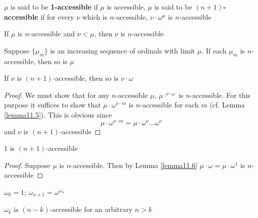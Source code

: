 \documentclass[11pt]{article}
\begin{document}
\begin{definition}[]
\(\mu\) is said to be \textbf{1-accessible} if \(\mu\) is accessible, \(\mu\) is said to be \textbf{\((n+1)\)-accessible} if for
every \(\nu\) which is \(n\)-accessible, \(\nu\cdot\omega^\mu\) is \(n\)-accessible
\end{definition}

\begin{lemma}[]
If \(\mu\) is \(n\)-accessible and \(\nu<\mu\), then \(\nu\) is \(n\)-accessible
\end{lemma}

\begin{lemma}[]
\label{lemma11.5}
Suppose \(\{\mu_m\}\) is an increasing sequence of ordinals with limit \(\mu\). If each \(\mu_m\)
is \(n\)-accessible, then so is \(\mu\)
\end{lemma}

\begin{lemma}[]
 \label{lemma11.6}
If \(\nu\) is \((n+1)\)-accessible, then so is \(\nu\cdot\omega\)
\end{lemma}

\begin{proof}
We must show that for any \(n\)-accessible \(\mu\), \(\mu\cdot^{\nu\cdot\omega}\) is \(n\)-accessible.
For this purpose it suffices to show that \(\mu\cdot\omega^{\nu\cdot m}\) is \(n\)-accessible for
each \(m\) (cf. Lemma \ref{lemma11.5}). This is obvious since
\begin{equation*}
 \mu\cdot\omega^{\nu\cdot m}=\mu\cdot\omega^\nu\dots\omega^\nu
\end{equation*}
and \(\nu\) is \((n+1)\)-accessible
\end{proof}

\begin{proposition}[]
1 is \((n+1)\)-accessible
\end{proposition}

\begin{proof}
Suppose \(\mu\) is \(n\)-accessible. Then by Lemma \ref{lemma11.6} \(\mu\cdot\omega=\mu\cdot\omega^1\) is \(n\)-accessible
\end{proof}

\begin{definition}[]
\(\omega_0=1\); \(\omega_{n+1}=\omega^{\omega_n}\)
\end{definition}

\begin{proposition}[]
\(\omega_k\) is \((n-k)\)-accessible for an arbitrary \(n>k\)
\end{proposition}
\end{document}
